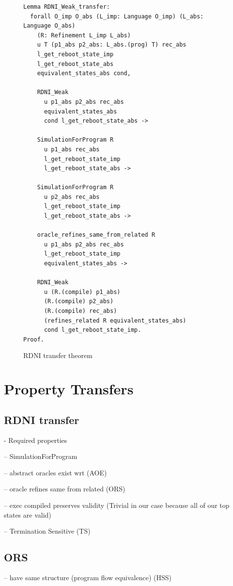 \iffalse 
\begin{figure}[ht]
    \centering
    \begin{verbatim}
Lemma RDNI_Weak_transfer:
  forall O_imp O_abs (L_imp: Language O_imp) (L_abs: Language O_abs) 
    (R: Refinement L_imp L_abs)
    u T (p1_abs p2_abs: L_abs.(prog) T) rec_abs
    l_get_reboot_state_imp
    l_get_reboot_state_abs
    equivalent_states_abs cond,

    RDNI_Weak
      u p1_abs p2_abs rec_abs
      equivalent_states_abs
      cond l_get_reboot_state_abs ->
    
    SimulationForProgram R 
      u p1_abs rec_abs 
      l_get_reboot_state_imp
      l_get_reboot_state_abs ->

    SimulationForProgram R 
      u p2_abs rec_abs 
      l_get_reboot_state_imp
      l_get_reboot_state_abs ->
    
    oracle_refines_same_from_related R 
      u p1_abs p2_abs rec_abs 
      l_get_reboot_state_imp 
      equivalent_states_abs ->
    
    RDNI_Weak
      u (R.(compile) p1_abs)
      (R.(compile) p2_abs)
      (R.(compile) rec_abs)
      (refines_related R equivalent_states_abs)
      cond l_get_reboot_state_imp.
Proof.
\end{verbatim}
    \caption{RDNI transfer theorem}
    \label{fig:RDNI_Transfer_Definition}
\end{figure}


\section{Property Transfers}

\subsection{RDNI transfer}
- Required properties

-- SimulationForProgram
    
-- abstract oracles exist wrt (AOE)

-- oracle refines same from related (ORS)

-- exec compiled preserves validity (Trivial in our case because all of our top states are valid)

-- Termination Sensitive (TS)

\subsection{ORS}
-- have same structure (program flow equivalence) (HSS)

